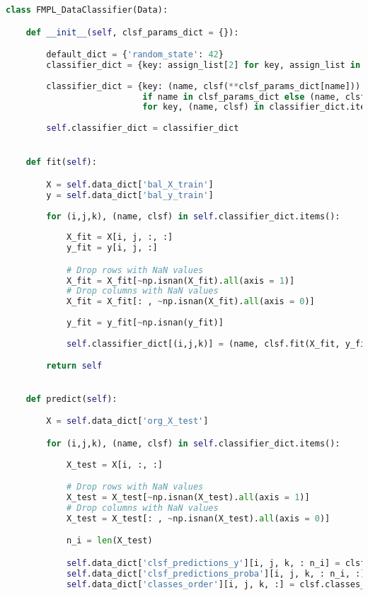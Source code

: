 \begin{lstlisting}[language=Python, numbers=none]
class FMPL_DataClassifier(Data):

    def __init__(self, clsf_params_dict = {}):

        default_dict = {'random_state': 42}
        classifier_dict = {key: assign_list[2] for key, assign_list in self.data_dict['assignment_dict'].items()}
        
        classifier_dict = {key: (name, clsf(**clsf_params_dict[name]))
                           if name in clsf_params_dict else (name, clsf(**default_dict))
                           for key, (name, clsf) in classifier_dict.items()}
        
        self.classifier_dict = classifier_dict


    def fit(self):

        X = self.data_dict['bal_X_train']
        y = self.data_dict['bal_y_train']
        
        for (i,j,k), (name, clsf) in self.classifier_dict.items():
            
            X_fit = X[i, j, :, :]
            y_fit = y[i, j, :]

            # Drop rows with NaN values
            X_fit = X_fit[~np.isnan(X_fit).all(axis = 1)]
            # Drop columns with NaN values
            X_fit = X_fit[: , ~np.isnan(X_fit).all(axis = 0)]
            
            y_fit = y_fit[~np.isnan(y_fit)]
            
            self.classifier_dict[(i,j,k)] = (name, clsf.fit(X_fit, y_fit))

        return self
    

    def predict(self):

        X = self.data_dict['org_X_test']

        for (i,j,k), (name, clsf) in self.classifier_dict.items():
            
            X_test = X[i, :, :]

            # Drop rows with NaN values
            X_test = X_test[~np.isnan(X_test).all(axis = 1)]
            # Drop columns with NaN values
            X_test = X_test[: , ~np.isnan(X_test).all(axis = 0)]

            n_i = len(X_test)

            self.data_dict['clsf_predictions_y'][i, j, k, : n_i] = clsf.predict(X_test)
            self.data_dict['clsf_predictions_proba'][i, j, k, : n_i, :] = clsf.predict_proba(X_test) 
            self.data_dict['classes_order'][i, j, k, :] = clsf.classes_

\end{lstlisting}

